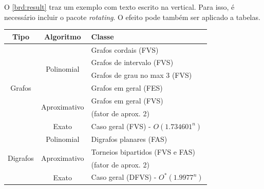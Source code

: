     O \cref{brd:result} traz um exemplo com texto escrito na vertical. Para isso, é necessário incluir o pacote \emph{rotating}. O efeito pode também ser aplicado a tabelas.

    \begin{board}[!htb]
        \small
        \centering
        \caption{Estudos de Feedback Set em Grafos e Digrafos}
        \label{brd:result}      
        \begin{tabular}{|c|c|l|} \hline
            \textbf{Tipo}                   & \textbf{Algoritmo}            & \textbf{Classe}                       \\ \hline
            \multirow{7}{*}{\begin{sideways}
                                Grafos
                            \end{sideways}} & \multirow{4}{*}{Polinomial}   & Grafos cordais (FVS)                  \\ 
                                            & ~                             & Grafos de intervalo (FVS)             \\ 
                                            & ~                             & Grafos de grau no max 3 (FVS)         \\
                                            & ~                             & Grafos em geral (FES)                 \\ \cline{2-3}
                                            & \multirow{2}{*}{Aproximativo} & Grafos em geral (FVS)                 \\ 
                                            & ~                             & (fator de aprox. 2)                   \\ \cline{2-3}  
                                            & \multirow{1}{*}{Exato}        & Caso geral (FVS) - $O(1.734601^n)$    \\ \hline 
            \multirow{4}{*}{\begin{sideways}
                                Digrafos
                            \end{sideways}}
                                            & Polinomial                    & Digrafos planares (FAS)               \\ \cline{2-3}
                                            & \multirow{2}{*}{Aproximativo} & Torneios bipartidos (FVS e FAS)       \\
                                            & ~                             & (fator de aprox. 2)                   \\ \cline{2-3} 
                                            & \multirow{1}{*}{Exato}        & Caso geral (DFVS) - $O^*(1.9977^n)$   \\ \hline
        \end{tabular}
        \vspace{0.2cm}
    \end{board}

